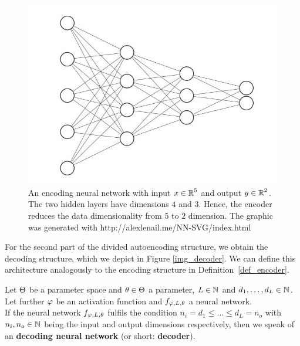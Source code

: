 \begin{figure}
\begin{center}
   \begin{minipage}[b]{0.7\linewidth}
      \includegraphics[width=\linewidth]{encoder}
      \caption{An encoding neural network with input $x\in \operatorname{\mathbb{R}}^5$ and output $y \in \operatorname{\mathbb{R}}^2$. The two hidden layers have dimensions $4$ and $3$. Hence, the encoder reduces the data dimensionality from $5$ to $2$ dimension. The graphic was generated with http://alexlenail.me/NN-SVG/index.html}\label{img_encoder}
	\end{minipage}
\end{center}
\end{figure}


For the second part of the divided autoencoding structure, we obtain the decoding structure, which we depict in Figure \ref{img_decoder}. We can define this architecture analogously to the encoding structure in Definition~\ref{def_encoder}.


\begin{definition}\label{def_decoder}
Let $\operatorname{\Theta}$ be a parameter space and $\theta \in \operatorname{\Theta}$ a parameter, $L\in \operatorname{\mathbb{N}}$ and $d_1,\ldots, d_L\in\operatorname{\mathbb{N}}$. Let further $\operatorname{\varphi}$ be an activation function and $f_{\operatorname{\varphi},L,\theta}$ a neural network.\\
If the neural network $f_{\operatorname{\varphi},L,\theta}$ fulfils the condition $n_i= d_1 \leq \ldots \leq d_L = n_o$ with $n_i, n_o \in \operatorname{\mathbb{N}}$ being the input and output dimensions respectively, then we speak of an \textbf{decoding neural network} (or short: \textbf{decoder}).
\end{definition}


